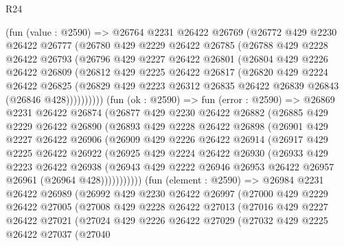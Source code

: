\begin{lexlean}{R24}
\begin{coremodule}
    (fun (value : @2590) =>
    @26764
      @2231
      @26422
      @26769
      (@26772
        @429
        @2230
        @26422
        @26777
        (@26780
          @429
          @2229
          @26422
          @26785
          (@26788
            @429
            @2228
            @26422
            @26793
            (@26796
              @429
              @2227
              @26422
              @26801
              (@26804
                @429
                @2226
                @26422
                @26809
                (@26812
                  @429
                  @2225
                  @26422
                  @26817
                  (@26820
                    @429
                    @2224
                    @26422
                    @26825
                    (@26829 @429 @2223 @26312 @26835 @26422 @26839 @26843 (@26846 @428))))))))))
    (fun (ok : @2590) =>
    fun (error : @2590) =>
    @26869
      @2231
      @26422
      @26874
      (@26877
        @429
        @2230
        @26422
        @26882
        (@26885
          @429
          @2229
          @26422
          @26890
          (@26893
            @429
            @2228
            @26422
            @26898
            (@26901
              @429
              @2227
              @26422
              @26906
              (@26909
                @429
                @2226
                @26422
                @26914
                (@26917
                  @429
                  @2225
                  @26422
                  @26922
                  (@26925
                    @429
                    @2224
                    @26422
                    @26930
                    (@26933
                      @429
                      @2223
                      @26422
                      @26938
                      (@26943 @429 @2222 @26946 @26953 @26422 @26957 @26961 (@26964 @428)))))))))))
    (fun (element : @2590) =>
    @26984
      @2231
      @26422
      @26989
      (@26992
        @429
        @2230
        @26422
        @26997
        (@27000
          @429
          @2229
          @26422
          @27005
          (@27008
            @429
            @2228
            @26422
            @27013
            (@27016
              @429
              @2227
              @26422
              @27021
              (@27024
                @429
                @2226
                @26422
                @27029
                (@27032
                  @429
                  @2225
                  @26422
                  @27037
                  (@27040

\end{coremodule}
\end{lexlean}
